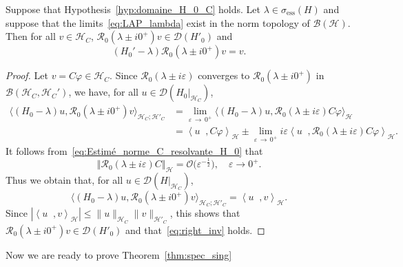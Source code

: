 \documentclass[AHL,Unicode,longabstracts,published]{cedram}
\newcommand{\Hi}{\mathcal{H}}
\newcommand{\ess}{\mathrm{ess}}
\newcommand{\norme}[1]{\left\Vert #1\right\Vert}
\newcommand{\scal}[2]{\left\langle{#1} \middle., {#2}\right\rangle}
\newcommand{\Res}{\mathcal{R}}
\newcommand{\clB}{\mathcal{B}}
\newcommand{\clD}{\mathcal{D}}
\newcommand{\Hi}{\mathcal{H}}
\newcommand{\ess}{\mathrm{ess}}
\begin{document}
\begin{lemm}\label{lm:Inverse_à_droite}
Suppose that Hypothesis~\ref{hyp:domaine_H_0_C} holds. Let $\lambda\in\sigma_\ess(H)$ and suppose that the limits~\eqref{eq:LAP_lambda} exist in the norm topology of $\clB(\Hi)$. Then for all $v\in \Hi_C$, $\Res_0(\lambda\pm i0^+)v\in\clD(H'_0)$ and
\begin{equation}\label{eq:right_inv}
(H_0'-\lambda)\Res_0\left(\lambda\pm i0^+\right)v = v.
\end{equation}
\end{lemm}

\begin{proof}
Let $v=C\varphi\in\Hi_C$. Since $\Res_0(\lambda\pm i\varepsilon)$ converges to $\Res_0(\lambda\pm i0^+)$ in $\clB(\Hi_C,\Hi_C')$, we have, for all $u\in\clD(H_0|_{\Hi_C})$,
\begin{align*}
\big \langle (H_0-\lambda)u,\Res_0\left(\lambda\pm i0^+\right)v\big\rangle_{\Hi_C;\Hi'_C}&=\lim_{\varepsilon\,\rightarrow\,0^+}\big\langle(H_0-\lambda)u, \Res_0(\lambda\pm i\varepsilon)C\varphi\big\rangle_\Hi\\
&=\scal{u}{C\varphi}_{\Hi}\pm\lim_{\varepsilon\,\rightarrow\,0^+}i\varepsilon\scal{u}{\Res_0(\lambda\pm i\varepsilon)C\varphi}_\Hi.
\end{align*}
It follows from~\eqref{eq:Estimé_norme_C_resolvante_H_0} that
\begin{equation*}
\norme{\Res_0(\lambda\pm i\varepsilon)C}_\Hi=\mathcal{O}\big(\varepsilon^{-\frac12}\big), \quad \varepsilon\rightarrow 0^+.
\end{equation*}
Thus we obtain that, for all $u\in\clD(H|_{\Hi_C})$,
\begin{equation*}
\big \langle (H_0-\lambda)u,\Res_0\left(\lambda\pm i0^+\right)v\big\rangle_{\Hi_C;\Hi'_C} = \scal{u}{v}_{\Hi}.
\end{equation*}
Since $|\scal{u}{v}_{\Hi}|\le\|u\|_{\Hi_C}\|v\|_{\Hi'_C}$, this shows that $\Res_0(\lambda\pm i0^+)v\in\clD(H'_0)$ and that~\eqref{eq:right_inv} holds.
\end{proof}

Now we are ready to prove Theorem~\ref{thm:spec_sing}
\end{document}
